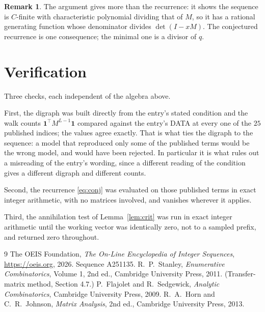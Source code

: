 \documentclass[11pt,a4paper]{article}
\theoremstyle{plain}
\theoremstyle{definition}
\newtheorem{remark}[theorem]{Remark}
\begin{document}
\begin{remark}
The argument gives more than the recurrence: it shows the sequence is $C$-finite with
characteristic polynomial dividing that of $M$, so it has a rational generating function
whose denominator divides $\det(I-xM)$. The conjectured recurrence is one consequence; the
minimal one is a divisor of $q$.
\end{remark}

\section{Verification}

Three checks, each independent of the algebra above.

First, the digraph was built directly from the entry's stated condition and the walk counts
$\mathbf{1}^{\!\top}M^{L-1}\mathbf{1}$ compared against the entry's DATA at
every one of the $25$ published indices; the values agree exactly. That is what ties
the digraph to the sequence: a model that reproduced only some of the published terms would
be the wrong model, and would have been rejected. In particular it is what rules out a
misreading of the entry's wording, since a different reading of the condition gives a
different digraph and different counts.

Second, the recurrence \eqref{eq:conj} was evaluated on those published terms in exact
integer arithmetic, with no matrices involved, and vanishes wherever it applies.

Third, the annihilation test of Lemma~\ref{lem:crit} was run in exact integer arithmetic
until the working vector was identically zero, not to a sampled prefix, and returned zero
throughout.

\begin{thebibliography}{9}
 The OEIS Foundation, \emph{The On-Line Encyclopedia of Integer
Sequences}, \url{https://oeis.org}, 2026. Sequence A251135.
 R.~P.~Stanley, \emph{Enumerative Combinatorics}, Volume 1, 2nd ed.,
Cambridge University Press, 2011. (Transfer-matrix method, Section 4.7.)
 P.~Flajolet and R.~Sedgewick, \emph{Analytic Combinatorics}, Cambridge
University Press, 2009.
 R.~A.~Horn and C.~R.~Johnson, \emph{Matrix Analysis}, 2nd ed., Cambridge
University Press, 2013.
\end{thebibliography}
\end{document}
